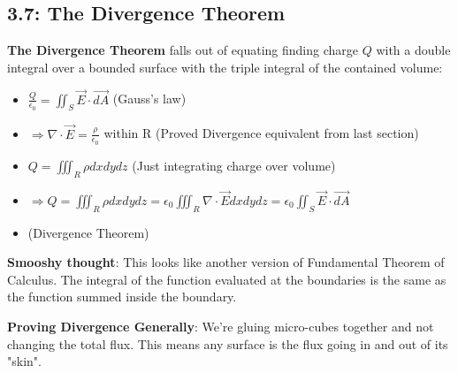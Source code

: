 \documentclass[11pt, oneside]{article}   	%
\begin{document}
\subsection{3.7:  The Divergence Theorem}

\textbf{The Divergence Theorem} falls out of equating finding charge $Q$ with a double integral over a bounded surface with the triple integral of the contained volume:
\begin{itemize}
\item $\frac{Q}{\epsilon_0} = \iint_S \vec{E} \cdot \vec{dA}$ (Gauss's law)
\item $\Rightarrow \nabla \cdot \vec{E} = \frac{\rho}{\epsilon_0}$ within R (Proved Divergence equivalent from last section)
\item $Q = \iiint_R \rho dx dy dz$ (Just integrating charge over volume)
\item $\Rightarrow Q = \iiint_R \rho dx dy dz = \epsilon_0  \iiint_R \nabla \cdot \vec{E} dx dy dz = \epsilon_0 \iint_S \vec{E} \cdot \vec{dA}$ 
\item {} (Divergence Theorem)
\end{itemize}


\textbf{Smooshy thought}: This looks like another version of Fundamental Theorem of Calculus.  The integral of the function evaluated at the boundaries is the same as the function summed inside the boundary.


\textbf{Proving Divergence Generally}: We're gluing micro-cubes together and not changing the total flux.  This means any surface is the flux going in and out of its "skin".
\end{document}

